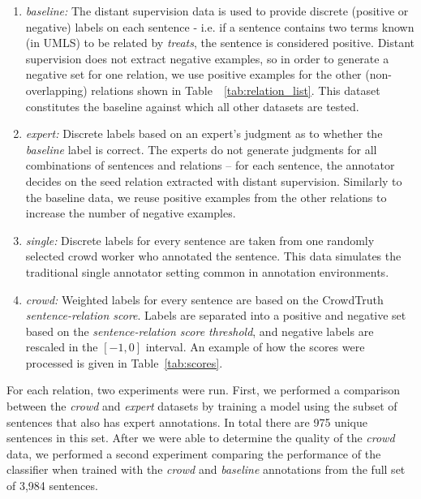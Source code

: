 \begin{enumerate}

\item \textit{baseline:} The distant supervision data is used to provide discrete (positive or negative) labels on each sentence - i.e. if a sentence contains two terms known (in UMLS) to be related by \textit{treats}, the sentence is considered positive. Distant supervision does not extract negative examples, so in order to generate a negative set for one relation, we use positive examples for the other (non-overlapping) relations shown in Table~~\ref{tab:relation_list}. This dataset constitutes the baseline against which all other datasets are tested.

\item \textit{expert:} Discrete labels based on an expert's judgment as to whether the \textit{baseline} label is correct. The experts do not generate judgments for all combinations of sentences and relations -- for each sentence, the annotator decides on the seed relation extracted with distant supervision.  Similarly to the baseline data, we reuse positive examples from the other relations to increase the number of negative examples.

\item \textit{single:} Discrete labels for every sentence are taken from one randomly selected crowd worker who annotated the sentence.  This data simulates the traditional single annotator setting common in annotation environments.

\item \textit{crowd:} Weighted labels for every sentence are based on the CrowdTruth \textit{sentence-relation score}.  Labels are separated into a positive and negative set based on the \textit{sentence-relation score threshold}, and negative labels are rescaled in the $[-1, 0]$ interval. An example of how the scores were processed is given in Table~\ref{tab:scores}.

\end{enumerate}

For each relation, two experiments were run. First, we performed a comparison between the \textit{crowd} and \textit{expert} datasets by training a model using the subset of sentences that also has expert annotations. In total there are 975 unique sentences in this set. After we were able to determine the quality of the \textit{crowd} data, we performed a second experiment comparing the performance of the classifier when trained with the \textit{crowd} and \textit{baseline} annotations from the full set of 3,984 sentences.


